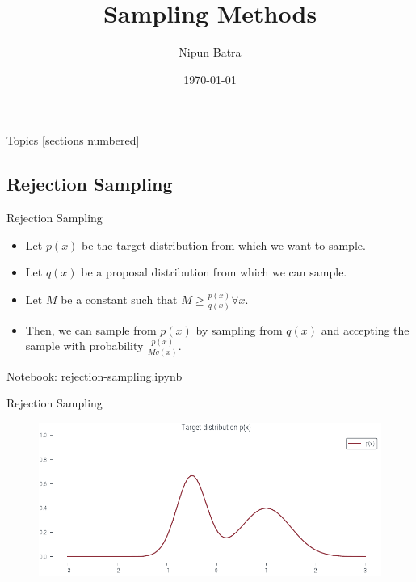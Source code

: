 \documentclass{beamer}
\begin{document}
\title{Sampling Methods}
\author{Nipun Batra}
\date{\today}
\maketitle

\begin{frame}{Topics}
    [sections numbered]
    \tableofcontents

\end{frame}

\subsection{Rejection Sampling}
    \begin{frame}{Rejection Sampling}
        \begin{itemize}
            \item Let $p(x)$ be the target distribution from which we want to sample.
            \pause \item Let $q(x)$ be a proposal distribution from which we can sample.
            \pause \item Let $M$ be a constant such that $M \geq \frac{p(x)}{q(x)} \forall x$.
            \pause \item Then, we can sample from $p(x)$ by sampling from $q(x)$ and accepting the sample with probability $\frac{p(x)}{M q(x)}$.
        \end{itemize}
        
    \end{frame}

    \begin{frame}
        Notebook: \url{rejection-sampling.ipynb}
    \end{frame}

   \begin{frame}{Rejection Sampling}
    \begin{figure}
        \centering
        \includegraphics[scale = 0.75]{../figures/sampling/rejection-sampling--1.0-False-False-False-False-False-False-False-False.pdf}
    \end{figure}
    
   \end{frame}
\end{document}
